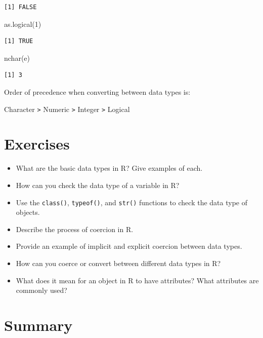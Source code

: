 \documentclass[
  letterpaper,
  DIV=11,
  numbers=noendperiod]{scrreprt}
\newenvironment{Shaded}{\begin{snugshade}}{\end{snugshade}}
\newcommand{\DecValTok}[1]{\textcolor[rgb]{0.68,0.00,0.00}{#1}}
\newcommand{\FunctionTok}[1]{\textcolor[rgb]{0.28,0.35,0.67}{#1}}
\newcommand{\NormalTok}[1]{\textcolor[rgb]{0.00,0.23,0.31}{#1}}
\begin{document}
\begin{verbatim}
[1] FALSE
\end{verbatim}

\begin{Shaded}
\begin{Highlighting}[]
\FunctionTok{as.logical}\NormalTok{(}\DecValTok{1}\NormalTok{)}
\end{Highlighting}
\end{Shaded}

\begin{verbatim}
[1] TRUE
\end{verbatim}

\begin{Shaded}
\begin{Highlighting}[]
\FunctionTok{nchar}\NormalTok{(e)}
\end{Highlighting}
\end{Shaded}

\begin{verbatim}
[1] 3
\end{verbatim}

Order of precedence when converting between data types is:

Character \texttt{\textgreater{}} Numeric \texttt{\textgreater{}}
Integer \texttt{\textgreater{}} Logical

\section{Exercises}\label{exercises-7}

\begin{itemize}
\item
  What are the basic data types in R? Give examples of each.
\item
  How can you check the data type of a variable in R?
\item
  Use the \texttt{class()}, \texttt{typeof()}, and \texttt{str()}
  functions to check the data type of objects.
\item
  Describe the process of coercion in R.
\item
  Provide an example of implicit and explicit coercion between data
  types.
\item
  How can you coerce or convert between different data types in R?
\item
  What does it mean for an object in R to have attributes? What
  attributes are commonly used?
\end{itemize}

\section{Summary}\label{summary-7}
\end{document}
